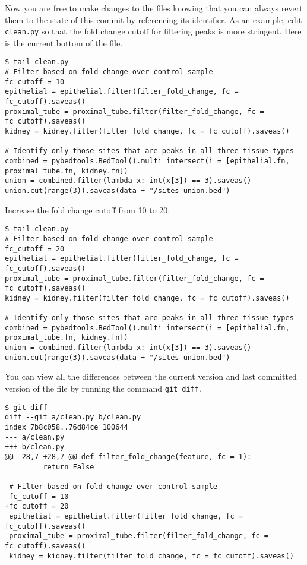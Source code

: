 Now you are free to make changes to the files knowing that you can always revert them to the state of this commit by referencing its identifier.
As an example, edit \verb|clean.py| so that the fold change cutoff for filtering peaks is more stringent.
Here is the current bottom of the file.

\begin{lstlisting}
$ tail clean.py
# Filter based on fold-change over control sample
fc_cutoff = 10
epithelial = epithelial.filter(filter_fold_change, fc = fc_cutoff).saveas()
proximal_tube = proximal_tube.filter(filter_fold_change, fc = fc_cutoff).saveas()
kidney = kidney.filter(filter_fold_change, fc = fc_cutoff).saveas()

# Identify only those sites that are peaks in all three tissue types
combined = pybedtools.BedTool().multi_intersect(i = [epithelial.fn, proximal_tube.fn, kidney.fn])
union = combined.filter(lambda x: int(x[3]) == 3).saveas()
union.cut(range(3)).saveas(data + "/sites-union.bed")
\end{lstlisting}

Increase the fold change cutoff from 10 to 20.

\begin{lstlisting}
$ tail clean.py
# Filter based on fold-change over control sample
fc_cutoff = 20
epithelial = epithelial.filter(filter_fold_change, fc = fc_cutoff).saveas()
proximal_tube = proximal_tube.filter(filter_fold_change, fc = fc_cutoff).saveas()
kidney = kidney.filter(filter_fold_change, fc = fc_cutoff).saveas()

# Identify only those sites that are peaks in all three tissue types
combined = pybedtools.BedTool().multi_intersect(i = [epithelial.fn, proximal_tube.fn, kidney.fn])
union = combined.filter(lambda x: int(x[3]) == 3).saveas()
union.cut(range(3)).saveas(data + "/sites-union.bed")
\end{lstlisting}

You can view all the differences between the current version and last committed version of the file by running the command \verb|git diff|.

\begin{lstlisting}
$ git diff
diff --git a/clean.py b/clean.py
index 7b8c058..76d84ce 100644
--- a/clean.py
+++ b/clean.py
@@ -28,7 +28,7 @@ def filter_fold_change(feature, fc = 1):
         return False

 # Filter based on fold-change over control sample
-fc_cutoff = 10
+fc_cutoff = 20
 epithelial = epithelial.filter(filter_fold_change, fc = fc_cutoff).saveas()
 proximal_tube = proximal_tube.filter(filter_fold_change, fc = fc_cutoff).saveas()
 kidney = kidney.filter(filter_fold_change, fc = fc_cutoff).saveas()
\end{lstlisting}

